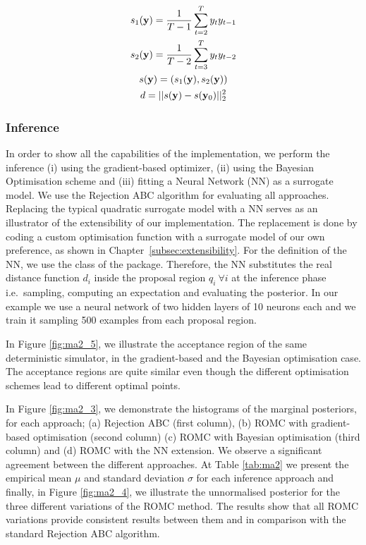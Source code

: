 \begin{gather} \label{eq:ma2_summary_1}
  s_1(\mathbf{y}) = \frac{1}{T-1} \sum_{t=2}^T y_ty_{t-1}\\ \label{eq:ma2_summary_2}
  s_2(\mathbf{y}) = \frac{1}{T-2} \sum_{t=3}^T y_ty_{t-2} \\
  s(\mathbf{y}) = (s_1(\mathbf{y}), s_2(\mathbf{y}))\\ \label{eq:ma2_summary_4}
  d = ||s(\mathbf{y}) - s(\mathbf{y}_0)||_2^2 
\end{gather}

\subsubsection*{Inference}

In order to show all the capabilities of the implementation, we
perform the inference (i) using the gradient-based optimizer, (ii)
using the Bayesian Optimisation scheme and (iii) fitting a Neural
Network (NN) as a surrogate model. We use the Rejection ABC algorithm
for evaluating all approaches. Replacing the typical quadratic
surrogate model with a NN serves as an illustrator of the
extensibility of our implementation. The replacement is done by coding
a custom optimisation function with a surrogate model of our own
preference, as shown in Chapter~\ref{subsec:extensibility}. For the
definition of the NN, we use the  class of the
 package. Therefore, the NN substitutes the real
distance function \(d_i\) inside the proposal region
\(q_i~ \forall i\) at the inference phase i.e.~sampling,
computing an expectation and evaluating the posterior. In our example
we use a neural network of two hidden layers of 10 neurons each and we
train it sampling 500 examples from each proposal region.

In Figure \ref{fig:ma2_5}, we illustrate the acceptance region of the
same deterministic simulator, in the gradient-based and the Bayesian
optimisation case. The acceptance regions are quite similar even though the
different optimisation schemes lead to different optimal points.

In Figure \ref{fig:ma2_3}, we demonstrate the histograms of the
marginal posteriors, for each approach; (a) Rejection ABC (first
column), (b) ROMC with gradient-based optimisation (second column) (c)
ROMC with Bayesian optimisation (third column) and (d) ROMC with the
NN extension. We observe a significant agreement between the
different approaches. At Table \ref{tab:ma2} we present the empirical
mean \(\mu\) and standard deviation \(\sigma\) for each inference
approach and finally, in Figure \ref{fig:ma2_4}, we illustrate the
unnormalised posterior for the three different variations of the ROMC
method. The results show that all ROMC variations provide consistent
results between them and in comparison with the standard Rejection ABC
algorithm.

